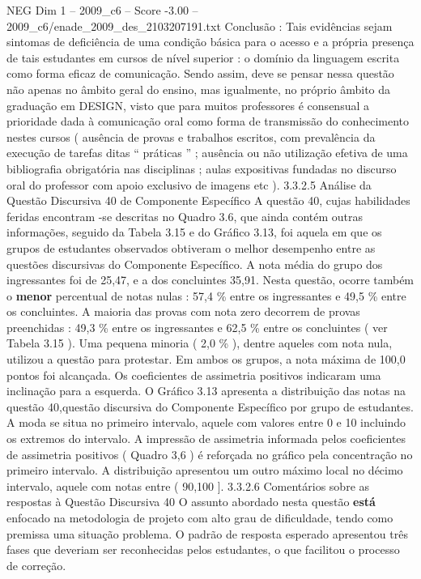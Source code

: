 \begin{textsample}{NEG Dim 1 – 2009\_c6 – Score -3.00 – 2009\_c6/enade\_2009\_des\_2103207191.txt}
Conclusão : Tais evidências sejam sintomas de deficiência de uma condição básica para o acesso e a própria presença de tais estudantes em cursos de nível superior : o domínio da linguagem escrita como forma eficaz de comunicação.
Sendo assim, deve se pensar nessa questão não apenas no âmbito geral do ensino, mas igualmente, no próprio âmbito da graduação em DESIGN, visto que para muitos professores é consensual a prioridade dada à comunicação oral como forma de transmissão do conhecimento nestes cursos ( ausência de provas e trabalhos escritos, com prevalência da execução de tarefas ditas “ práticas ” ; ausência ou não utilização efetiva de uma bibliografia obrigatória nas disciplinas ; aulas expositivas fundadas no discurso oral do professor com apoio exclusivo de imagens etc ). 3.3.2.5 Análise da Questão Discursiva 40 de Componente Específico A questão 40, cujas habilidades feridas encontram -se descritas no Quadro 3.6, que ainda contém outras informações, seguido da Tabela 3.15 e do Gráfico 3.13, foi aquela em que os grupos de estudantes observados obtiveram o melhor desempenho entre as questões discursivas do Componente Específico.
A nota média do grupo dos ingressantes foi de 25,47, e a dos concluintes 35,91.
Nesta questão, ocorre também o \textbf{menor} percentual de notas nulas : 57,4 \% entre os ingressantes e 49,5 \% entre os concluintes.
A maioria das provas com nota zero decorrem de provas preenchidas : 49,3 \% entre os ingressantes e 62,5 \% entre os concluintes ( ver Tabela 3.15 ).
Uma pequena minoria ( 2,0 \% ), dentre aqueles com nota nula, utilizou a questão para protestar.
Em ambos os grupos, a nota máxima de 100,0 pontos foi alcançada.
Os coeficientes de assimetria positivos indicaram uma inclinação para a esquerda.
O Gráfico 3.13 apresenta a distribuição das notas na questão 40,questão discursiva do Componente Específico por grupo de estudantes.
A moda se situa no primeiro intervalo, aquele com valores entre 0 e 10 incluindo os extremos do intervalo.
A impressão de assimetria informada pelos coeficientes de assimetria positivos ( Quadro 3,6 ) é reforçada no gráfico pela concentração no primeiro intervalo.
A distribuição apresentou um outro máximo local no décimo intervalo, aquele com notas entre ( 90,100 ]. 3.3.2.6 Comentários sobre as respostas à Questão Discursiva 40 O assunto abordado nesta questão \textbf{está} enfocado na metodologia de projeto com alto grau de dificuldade, tendo como premissa uma situação problema.
O padrão de resposta esperado apresentou três fases que deveriam ser reconhecidas pelos estudantes, o que facilitou o processo de correção.

\end{textsample}
